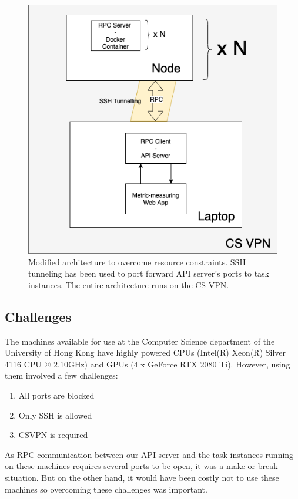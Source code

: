 \documentclass{report}
\begin{document}
\begin{figure}[h!]
  \includegraphics[width=\textwidth]{InfrastructureDepartment.png}
  \caption{Modified architecture to overcome resource constraints. SSH tunneling has been used to port forward API server's ports to task instances. The entire architecture runs on the CS VPN.}
  \label{fig:InfrastructureDepartment}
\end{figure}

\subsection{Challenges}

The machines available for use at the Computer Science department of the University of Hong Kong have highly powered CPUs (Intel(R) Xeon(R) Silver 4116 CPU @ 2.10GHz) and GPUs (4 x GeForce RTX 2080 Ti). However, using them involved a few challenges:
\begin{enumerate}
  \item All ports are blocked
  \item Only SSH is allowed
  \item CSVPN is required
\end{enumerate}

As RPC communication between our API server and the task instances running on these machines requires several ports to be open, it was a make-or-break situation. But on the other hand, it would have been costly not to use these machines so overcoming these challenges was important.
\end{document}
